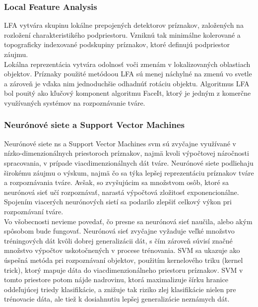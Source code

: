 \subsubsection{Local Feature Analysis}
LFA vytvára skupinu lokálne prepojených detektorov príznakov, založených na rozložení charakteristikého podpriestoru.
Vzniknú tak minimálne kolerované a topograficky indexované podskupiny príznakov, ktoré definujú podpriestor záujmu. \cite{handbookbio} \\

\indent Lokálna reprezentácia vytvára odolnosť voči zmenám v lokalizovaných oblastiach objektov.
Príznaky použité metódoou LFA sú menej náchylné na zmenú vo svetle a zároveň je vďaka nim jednoduchšie odhadnúť
rotáciu objektu.
Algoritmus LFA bol pouitý ako kľučový komponent algoritmu FaceIt, ktorý je jedným z komerčne využívaných systémov na rozpoznávanie tváre\cite{handbookbio}.

\subsubsection{Neurónové siete a Support Vector Machines}\label{svm}
Neurónové siete \acrshort{ns} a Support Vector Machines \acrshort{svm} sú zvyčajne využívané v nízko-dimenzionálnych priestoroch príznakov, najmä kvoli výpočtovej náročnosti spracovania,
v prípade viacdimenzionálnych dát tváre\cite{handbookbio}.
Neurónové siete podliehaju širokému záujmu o výskum, najmä čo sa týka lepšej reprezentáciu príznakov tváre a rozpoznávania tváre.
Avšak, so zvyšujúcim sa množstvom osôb, ktoré sa neurónová sieť učí rozpoznávať, narastá výpočtová zložitosť exponencionálne.
Spojením viacerých neurónových sietí sa podarilo zlepšiť celkový výkon pri rozpoznávaní tváre.\\

\indent Vo všobecnosti nevieme povedať, čo presne sa neurónová sieť naučila, alebo akým spôsobom bude fungovať.
Neurónová sieť zvyčajne vyžaduje veľké množstvo tréningových dát kvôli dobrej generalizácii dát, s čím zároveň súvisí značné množstvo výpočtov uskotočnených v procese trénovania.
SVM sa ukazuje ako úspešná metóda pri rozpoznávaní objektov, použitím kernelového triku (kernel trick), ktorý mapuje dáta do viacdimenzionálneho priestoru príznakov\cite{handbookbio}.
SVM v tomto priestore potom nájde nadrovinu, ktorá maximalizuje šírku hranice oddeľujúcej triedy klasifikácie, a znižuje tak riziko zlej klasifikácie nielen pre trénovacie dáta,
ale tiež k dosiahnutiu lepšej generalizácie neznámych dát.\cite{handbookbio} \\

